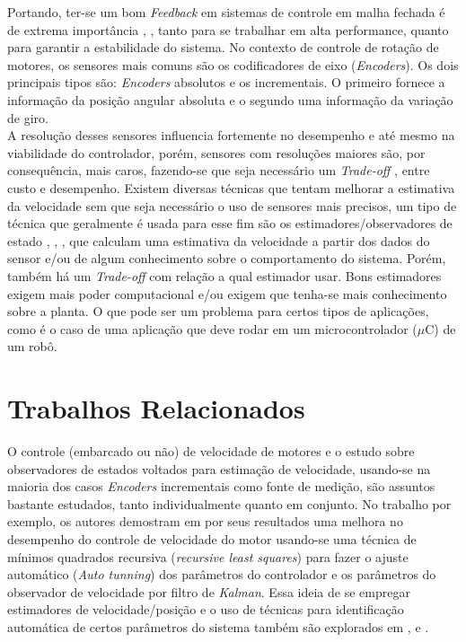 Portando, ter-se um bom \emph{Feedback} em sistemas de controle em malha fechada é de extrema importância \cite{analise_incr_enc}, \cite{simple_speed_feedback}, tanto para se trabalhar em alta performance, quanto para garantir a estabilidade do sistema. No contexto de controle de rotação de motores, os sensores mais comuns são os codificadores de eixo (\emph{Encoders}). Os dois principais tipos são: \emph{Encoders} absolutos e os incrementais. O primeiro fornece a informação da posição angular absoluta e o segundo uma informação da variação de giro. \\

A resolução desses sensores influencia fortemente no desempenho e até mesmo na viabilidade do controlador, porém, sensores com resoluções maiores são, por consequência, mais caros, fazendo-se que seja necessário um \emph{Trade-off} \cite{analise_incr_enc}, \cite{low_precision_encoder01} entre custo e desempenho. Existem diversas técnicas que tentam melhorar a estimativa da velocidade sem que seja necessário o uso de sensores mais precisos, um tipo de técnica que geralmente é usada para esse fim são os estimadores/observadores de estado \cite{analise_incr_enc}, \cite{speed_observer_IA}, \cite{observer_speed}, que calculam uma estimativa da velocidade a partir dos dados do sensor e/ou de algum conhecimento sobre o comportamento do sistema. Porém, também há um \emph{Trade-off} com relação a qual estimador usar. Bons estimadores exigem mais poder computacional e/ou exigem que tenha-se mais conhecimento sobre a planta. O que pode ser um problema para certos tipos de aplicações, como é o caso de uma aplicação que deve rodar em um microcontrolador ($\mu$C) de um robô.\\

\section{Trabalhos Relacionados}
\label{sec:trabalhos_relacionados}

O controle (embarcado ou não) de velocidade de motores e o estudo sobre observadores de estados voltados para estimação de velocidade, usando-se na maioria dos casos \emph{Encoders} incrementais como fonte de medição, são assuntos bastante estudados, tanto individualmente quanto em conjunto. No trabalho \cite{low_precision_encoder01} por exemplo, os autores demostram em por seus resultados uma melhora no desempenho do controle de velocidade do motor usando-se uma técnica de mínimos quadrados recursiva (\emph{recursive least squares}) para fazer o ajuste automático (\emph{Auto tunning}) dos parâmetros do controlador e os parâmetros do observador de velocidade por filtro de \emph{Kalman}. Essa ideia de se empregar estimadores de velocidade/posição e o uso de técnicas para identificação automática de certos parâmetros do sistema também são explorados em \cite{LOW_SPEED_CONTROL}, \cite{Y_HORI_01} e \cite{Y_HORI_02}.\\

